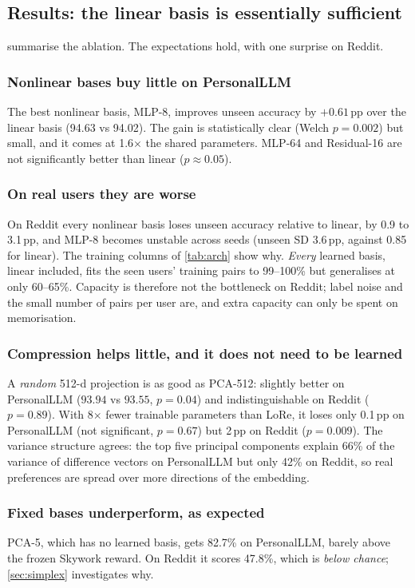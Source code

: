 \documentclass[11pt,a4paper]{article}
\newcommand{\pp}{\,pp\xspace}
\begin{document}
\subsection{Results: the linear basis is essentially sufficient}

 summarise the ablation. The expectations hold, with one surprise on Reddit.

\subsubsection*{Nonlinear bases buy little on PersonalLLM}
The best nonlinear basis, MLP-8, improves unseen accuracy by $+0.61$\pp over the linear basis (94.63
vs 94.02). The gain is statistically clear (Welch $p=0.002$) but small, and it comes at 1.6$\times$ the
shared parameters. MLP-64 and Residual-16 are not significantly better than linear ($p\approx0.05$).

\subsubsection*{On real users they are worse}
On Reddit every nonlinear basis loses unseen accuracy relative to linear, by 0.9 to 3.1\pp, and MLP-8
becomes unstable across seeds (unseen SD 3.6\pp, against 0.85 for linear). The training columns of
\cref{tab:arch} show why. \emph{Every} learned basis, linear included, fits the seen users' training
pairs to 99--100\% but generalises at only 60--65\%. Capacity is therefore not the bottleneck on
Reddit; label noise and the small number of pairs per user are, and extra capacity can only be spent
on memorisation.

\subsubsection*{Compression helps little, and it does not need to be learned}
A \emph{random} 512-d projection is as good as PCA-512: slightly better on PersonalLLM ($93.94$ vs
$93.55$, $p=0.04$) and indistinguishable on Reddit ($p=0.89$). With 8$\times$ fewer trainable parameters
than LoRe, it loses only 0.1\pp on PersonalLLM (not significant, $p=0.67$) but 2\pp on Reddit
($p=0.009$). The variance structure agrees: the top five principal components explain 66\% of the
variance of difference vectors on PersonalLLM but only 42\% on Reddit, so real preferences are spread
over more directions of the embedding.

\subsubsection*{Fixed bases underperform, as expected}
PCA-5, which has no learned basis, gets 82.7\% on PersonalLLM, barely above the frozen Skywork reward.
On Reddit it scores 47.8\%, which is \emph{below chance}; \cref{sec:simplex} investigates why.
\end{document}
